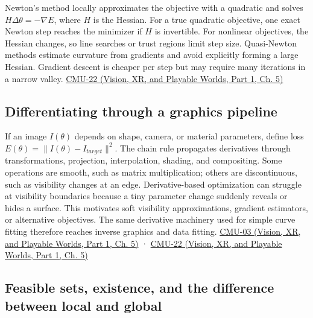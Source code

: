 Newton's method locally approximates the objective with a quadratic and solves \(H\Delta\theta=-\nabla E\), where \(H\) is the Hessian. For a true quadratic objective, one exact Newton step reaches the minimizer if \(H\) is invertible. For nonlinear objectives, the Hessian changes, so line searches or trust regions limit step size. Quasi-Newton methods estimate curvature from gradients and avoid explicitly forming a large Hessian. Gradient descent is cheaper per step but may require many iterations in a narrow valley. \href{../07-Vision-XR-and-Playable-Worlds-P01/main.pdf\#nameddest=04-visual-computing-ii-ch036-cmu-22---optimization}{CMU-22 (Vision, XR, and Playable Worlds, Part 1, Ch. 5)}

\subsection{Differentiating through a graphics pipeline}\label{04-visual-computing-ii-ch029-differentiating-through-a-graphics-pipeline}

\hypertarget{04-visual-computing-ii-ch029-differentiating-through-a-graphics-pipeline}{}

If an image \(I(\theta)\) depends on shape, camera, or material parameters, define loss \(E(\theta)=\|I(\theta)-I_{target}\|^2\). The chain rule propagates derivatives through transformations, projection, interpolation, shading, and compositing. Some operations are smooth, such as matrix multiplication; others are discontinuous, such as visibility changes at an edge. Derivative-based optimization can struggle at visibility boundaries because a tiny parameter change suddenly reveals or hides a surface. This motivates soft visibility approximations, gradient estimators, or alternative objectives. The same derivative machinery used for simple curve fitting therefore reaches inverse graphics and data fitting. \href{../07-Vision-XR-and-Playable-Worlds-P01/main.pdf\#nameddest=04-visual-computing-ii-ch036-cmu-03---vector-calculus-preview}{CMU-03 (Vision, XR, and Playable Worlds, Part 1, Ch. 5)} · \href{../07-Vision-XR-and-Playable-Worlds-P01/main.pdf\#nameddest=04-visual-computing-ii-ch036-cmu-22---optimization}{CMU-22 (Vision, XR, and Playable Worlds, Part 1, Ch. 5)}

\subsection{Feasible sets, existence, and the difference between local and global}\label{04-visual-computing-ii-ch029-feasible-sets-existence-and-the-difference-between-local-and-global}

